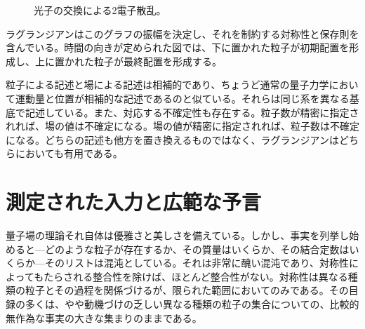 \begin{figure}[htbp]
\centering
{}
\caption{光子の交換による2電子散乱。}
\end{figure}

ラグランジアンはこのグラフの振幅を決定し、それを制約する対称性と保存則を含んでいる。時間の向きが定められた図では、下に置かれた粒子が初期配置を形成し、上に置かれた粒子が最終配置を形成する。

\begin{classroomqa}
\end{classroomqa}

粒子による記述と場による記述は相補的であり、ちょうど通常の量子力学において運動量と位置が相補的な記述であるのと似ている。それらは同じ系を異なる基底で記述している。また、対応する不確定性も存在する。粒子数が精密に指定されれば、場の値は不確定になる。場の値が精密に指定されれば、粒子数は不確定になる。どちらの記述も他方を置き換えるものではなく、ラグランジアンはどちらにおいても有用である。

\begin{classroomqa}
\end{classroomqa}

\section{測定された入力と広範な予言}

量子場の理論それ自体は優雅さと美しさを備えている。しかし、事実を列挙し始めると---どのような粒子が存在するか、その質量はいくらか、その結合定数はいくらか---そのリストは混沌としている。それは非常に醜い混沌であり、対称性によってもたらされる整合性を除けば、ほとんど整合性がない。対称性は異なる種類の粒子とその過程を関係づけるが、限られた範囲においてのみである。その目録の多くは、やや動機づけの乏しい異なる種類の粒子の集合についての、比較的無作為な事実の大きな集まりのままである。

